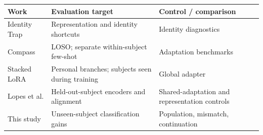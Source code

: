 \begin{tabular}{p{1.0in}p{2.9in}p{2.5in}}
\toprule
Work & Evaluation target & Control / comparison \\
\midrule
Identity Trap & Representation and identity shortcuts & Identity diagnostics \\
Compass & LOSO; separate within-subject few-shot & Adaptation benchmarks \\
Stacked LoRA & Personal branches; subjects seen during training & Global adapter \\
Lopes et al. & Held-out-subject encoders and alignment & Shared-adaptation and representation controls \\
This study & Unseen-subject classification gains & Population, mismatch, continuation \\
\bottomrule
\end{tabular}
